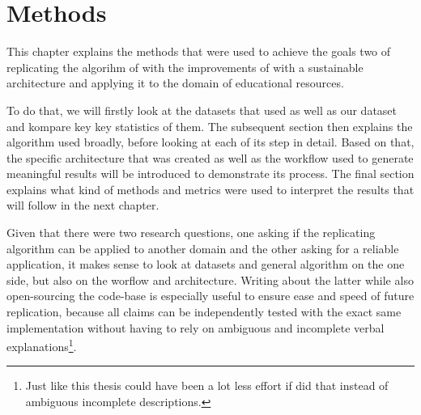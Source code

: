 \chapter{Methods}


This chapter explains the methods that were used to achieve the goals two of replicating the algorihm of \textcite{Derrac2015} with the improvements of \cite{Ager2018,Alshaikh2020} with a sustainable architecture and applying it to the domain of educational resources.  

To do that, we will firstly look at the datasets that used as well as our dataset and kompare key key statistics of them. The subsequent section then explains the algorithm used broadly, before looking at each of its step in detail. Based on that, the specific architecture that was created as well as the workflow used to generate meaningful results will be introduced to demonstrate its process. The final section explains what kind of methods and metrics were used to interpret the results that will follow in the next chapter.

Given that there were two research questions, one asking if the replicating algorithm can be applied to another domain and the other asking for a reliable application, it makes sense to look at datasets and general algorithm on the one side, but also on the worflow and architecture. Writing about the latter while also open-sourcing the code-base is especially useful to ensure ease and speed of future replication, because all claims can be independently tested with the exact same implementation without having to rely on ambiguous and incomplete verbal explanations\footnote{Just like this thesis could have been a lot less effort if \mainalgos did that instead of ambiguous incomplete descriptions. }. 




